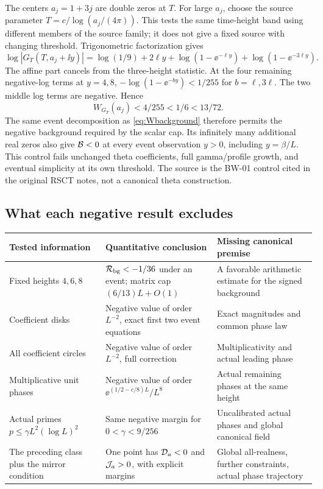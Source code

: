 The centers \(a_j=1+3j\) are double zeros at \(T\).
For large \(a_j\), choose the source parameter
\(T=c/\log(a_j/(4\pi))\). This tests the same time-height band using
different members of the source family; it does not give a fixed
source with changing threshold. Trigonometric factorization gives
\[
 \log|G_T(T,a_j+\ii y)|
 =\log(1/9)+2\ell y+
             \log(1-\ee^{-\ell y})+\log(1-\ee^{-3\ell y}).
\]
The affine part cancels from the three-height statistic.
At the four remaining negative-log terms at \(y=4,8\),
\(-\log(1-\ee^{-by})<1/255\) for \(b=\ell,3\ell\).
The two middle log terms are negative. Hence
\begin{equation}\label{eq:controlcap}
 W_{G_T}(a_j)<4/255<1/6<13/72.
\end{equation}
The same event decomposition as \eqref{eq:Wbackground} therefore
permits the negative background required by the scalar cap.
Its infinitely many additional real zeros also give \(\mathcal B<0\) at
every event observation \(y>0\), including \(y=\beta/L\).
This control fails unchanged theta coefficients, full gamma/profile
growth, and eventual simplicity at its own threshold. The source is
the BW-01 control cited in the original RSCT notes, not a canonical
theta construction.

\subsection{What each negative result excludes}

\begin{center}
\small
\begin{tabularx}{\textwidth}{@{}>{\raggedright\arraybackslash}p{}
 >{\raggedright\arraybackslash}X >{\raggedright\arraybackslash}X@{}}
\toprule
Tested information & Quantitative conclusion & Missing canonical premise\\
\midrule
Fixed heights \(4,6,8\)&
\(\mathcal R_{\rm bg}<-1/36\) under an event; matrix cap
\((6/13)L+O(1)\)&
A favorable arithmetic estimate for the signed background\\
\addlinespace
Coefficient disks&
Negative value of order \(L^{-2}\), exact first two event equations&
Exact magnitudes and common phase law\\
\addlinespace
All coefficient circles&
Negative value of order \(L^{-2}\), full correction&
Multiplicativity and actual leading phase\\
\addlinespace
Multiplicative unit phases&
Negative value of order \(\ee^{(1/2-c/8)L}/L^8\)&
Actual remaining phases at the same height\\
\addlinespace
Actual primes \(p\le\gamma L^2(\log L)^2\)&
Same negative margin for \(0<\gamma<9/256\)&
Uncalibrated actual phases and global canonical field\\
\addlinespace
The preceding class plus the mirror condition&
One point has \(\mathcal D_a<0\) and \(\mathcal J_a>0\), with explicit margins&
Global all-realness, further constraints, actual phase trajectory\\
\bottomrule
\end{tabularx}
\end{center}

